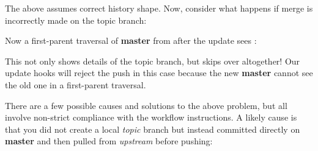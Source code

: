 The above assumes correct history shape. Now, consider what happens if merge
 is incorrectly made on the topic branch:

\begin{figure}
\centering
{}
\label{fig:IncorrectMerge}
\end{figure}

Now a first-parent traversal of \textbf{master} from after the update sees
     :

\begin{figure}
\centering
{}
\label{fig:FirstParentTraversal}
\end{figure}

This not only shows details of the topic branch, but skips over 
altogether! Our update hooks will reject the push in this case because the
new \textbf{master} cannot see the old one in a first-parent traversal.

There are a few possible causes and solutions to the above problem, but all
involve non-strict compliance with the workflow instructions. A likely cause is
that you did not create a local \textit{topic} branch but instead committed
directly on \textbf{master} and then pulled from \textit{upstream} before
pushing:

